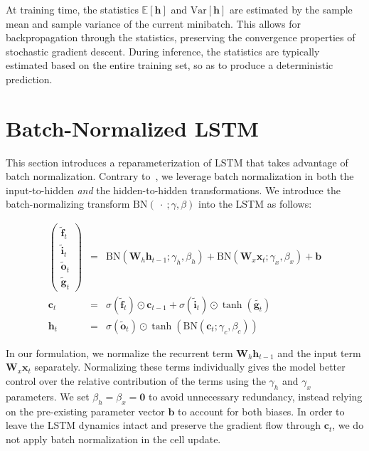 \documentclass{article} \pdfoutput=1 \usepackage[utf8]{inputenc}
\newcommand{\vect}[1]{\mathbf{#1}}
\newcommand{\mat}[1]{\mathbf{#1}}
\newcommand{\ewprod}{\odot}
\begin{document}
At training time, the statistics $\mathbb{E}[\vect{h}]$ and
$\mathrm{Var}[\vect{h}]$ are estimated by the sample mean and sample variance
of the current minibatch.  This allows for backpropagation through the
statistics, preserving the convergence properties of stochastic gradient
descent.  During inference, the statistics are typically estimated based on the
entire training set, so as to produce a deterministic prediction.

\section{Batch-Normalized LSTM}
\label{sec:recurrent-batch-normalization}

This section introduces a reparameterization of LSTM that takes advantage of
batch normalization. Contrary to~\citet{cesar, baidu}, we leverage batch
normalization in both the input-to-hidden \emph{and} the hidden-to-hidden
transformations.  We introduce the batch-normalizing transform $\mathrm{BN}(\
\cdot\ ; \gamma, \beta)$ into the LSTM as follows:

\begin{eqnarray}
\left(\begin{array}{ccc}
\tilde{\vect{f}}_t \\
\tilde{\vect{i}}_t \\
\tilde{\vect{o}}_t \\
\tilde{\vect{g}}_t
\end{array}\right)
 &=&
 \mathrm{BN} (\mat{W}_h \vect{h}_{t-1}; \gamma_h, \beta_h) +
 \mathrm{BN} (\mat{W}_x \vect{x}_t   ; \gamma_x, \beta_x) +
 \vect{b}
\\
\vect{c}_t &=& \sigma(\tilde{\vect{f}}_t) \ewprod \vect{c}_{t-1} +
               \sigma(\tilde{\vect{i}}_t) \ewprod \tanh(\tilde{\vect{g}_t}) \\
\vect{h}_t &=& \sigma(\tilde{\vect{o}}_t) \ewprod \tanh(
 \mathrm{BN} (\vect{c}_t; \gamma_c, \beta_c)
)
\end{eqnarray}

In our formulation, we normalize the recurrent term $\mat{W}_h \vect{h}_{t-1}$
and the input term $\mat{W}_x \vect{x}_t$ separately.  Normalizing these terms
individually gives the model better control over the relative contribution of
the terms using the $\gamma_h$ and $\gamma_x$ parameters.  We set $\beta_h =
\beta_x = \vect{0}$ to avoid unnecessary redundancy, instead relying on the
pre-existing parameter vector $\vect{b}$ to account for both biases.  In order
to leave the LSTM dynamics intact and preserve the gradient flow through
$\vect{c}_t$, we do not apply batch normalization in the cell update.
\end{document}
